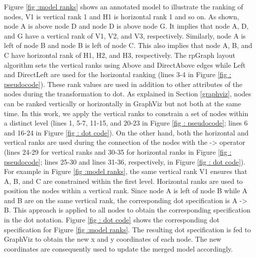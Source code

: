 Figure \ref{fig :model ranks} shows an annotated model to illustrate the ranking of nodes, V1 is vertical rank 1 and H1 is horizontal rank 1 and so on. As shown, node A is above node D and node D is above node G. It implies that node A, D, and G have a vertical rank of V1, V2, and V3, respectively. Similarly, node A is left of node B and node B is left of node C. This also implies that node A, B, and C have horizontal rank of H1, H2, and H3, respectively. The rpGraph layout algorithm sets the vertical ranks using Above and DirectAbove edges while Left and DirectLeft are used for the horizontal ranking (lines 3-4 in Figure \ref{fig : pseudocode}). These rank values are used in addition to other attributes of the nodes during the transformation to dot. As explained in Section \ref{graphviz}, nodes can be ranked vertically or horizontally in GraphViz but not both at the same time. In this work, we apply the vertical ranks to constrain a set of nodes within a distinct level (lines 1, 5-7, 11-15, and 20-23 in Figure \ref{fig : pseudocode}; lines 6 and 16-24 in Figure \ref{fig : dot code}). On the other hand, both the horizontal and vertical ranks are used during the connection of the nodes with the -> operator (lines 24-29 for vertical ranks and 30-35 for horizontal ranks in Figure \ref{fig : pseudocode}; lines 25-30 and lines 31-36, respectively, in Figure \ref{fig : dot code}). For example in Figure \ref{fig :model ranks}, the same vertical rank V1 ensures that A, B, and C are constrained within the first level. Horizontal ranks are used to position the nodes within a vertical rank. Since node A is left of node B while A and B are on the same vertical rank, the corresponding dot specification is A -> B. This approach is applied to all nodes to obtain the corresponding specification in the dot notation. Figure \ref{fig : dot code} shows the corresponding dot specification for Figure \ref{fig :model ranks}. The resulting dot specification is fed to GraphViz to obtain the new x and y coordinates of each node. The new coordinates are consequently used to update the merged model accordingly.

